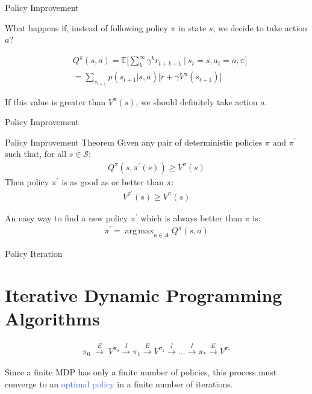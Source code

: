 \documentclass{beamer}
\DeclareMathOperator*{\argmax}{arg\,max}
\begin{document}
\begin{frame}{Policy Improvement}

What happens if, instead of following policy $\pi$ in state $s$, we decide to take action $a$?

\begin{align*}
    &Q^{\pi}(s,a) = \mathds{E} \bigg[\sum_{k}^{\infty}\gamma^{k} r_{t+k+1} \: \bigg| \: s_t=s, a_t=a,\pi \bigg] \\
		   & =  \sum_{s_{t+1}} p(s_{t+1}|s,a)\big[r + \gamma V^{\pi}(s_{t+1}) \big]
\end{align*}

If this value is greater than $V^{\pi}(s)$, we should definitely take action $a$.

\end{frame}

\begin{frame}{Policy Improvement}


\begin{block}{Policy Improvement Theorem}
Given any pair of deterministic policies $\pi$ and $\pi^{\prime}$ such that, for all $s \in \mathcal{S}$:
\begin{align*}
Q^{\pi}(s, \pi^{\prime}(s)) \geq V^{\pi}(s)
\end{align*}
Then policy $\pi^{\prime}$ is as good as or better than $\pi$:
\begin{align*}
    V^{\pi^{\prime}}(s) \geq V^{\pi}(s)
\end{align*}
\end{block}

\hspace{1mm}

An easy way to find a new policy $\pi^{\prime}$ which is always better than $\pi$ is:
\begin{align*}
    \pi^{\prime} = \argmax_{a \in A} Q^{\pi}(s,a)
\end{align*}

\end{frame}

\begin{frame}{Policy Iteration}
\section{Iterative Dynamic Programming Algorithms}

\begin{align*}
\pi_0 \; \overset{E}{\longrightarrow} \; V^{\pi_0} \overset{I}\longrightarrow \pi_1 \overset{E}\longrightarrow V^{\pi_1} \overset{I}\longrightarrow . . . \overset{I}\longrightarrow \pi_{*} \overset{E}\longrightarrow V^{\pi_*}
\end{align*}

Since a finite MDP has only a finite number of policies, this process must converge to an \textcolor{RoyalBlue}{optimal policy} in a finite number of iterations.

\end{frame}
\end{document}
